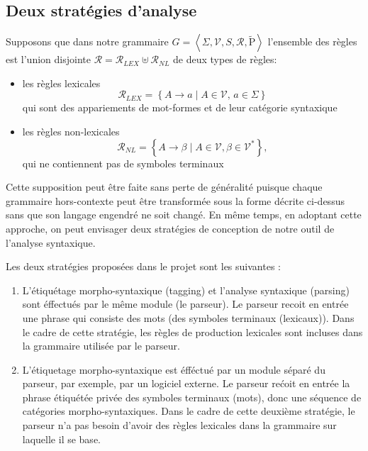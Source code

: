 \documentclass[12pt]{article}
\begin{document}
\subsection{Deux strat\'egies d'analyse}

Supposons que dans notre grammaire $G = \left< \Sigma, \mathscr{V}, S, \mathscr{R}, \tilde{\mathrm{P}} \right>$ 
l'ensemble des r\`egles est l'union disjointe $\mathscr{R} = \mathscr{R}_{LEX} \uplus \mathscr{R}_{NL}$ de deux types de r\`egles:

\begin{itemize}
\item les r\`egles lexicales
$$\mathscr{R}_{LEX} = \left\{ A \rightarrow a \mid
        A \in \mathscr{V}, \, a \in \Sigma \right\}$$
qui sont des appariements de mot-formes et de leur cat\'egorie syntaxique
\item les r\`egles non-lexicales
$$\mathscr{R}_{NL} = \left\{ A \rightarrow \beta \mid
     A \in \mathscr{V}, \beta \in \mathscr{V}^* \right\},$$
qui ne contiennent pas de symboles terminaux
\end{itemize}

Cette supposition peut \^etre faite sans perte de g\'en\'eralit\'e puisque
chaque grammaire hors-contexte peut \^etre transform\'ee sous la forme d\'ecrite ci-dessus sans
que son langage engendr\'e ne soit chang\'e. En m\^eme temps, en adoptant cette
approche, on peut envisager deux strat\'egies de conception de notre outil de
l'analyse syntaxique.

Les deux strat\'egies propos\'ees dans le projet sont les suivantes :
\begin{enumerate}
  \item L'\'etiqu\'etage morpho-syntaxique (tagging) et l'analyse syntaxique
  (parsing) sont \'effectu\'es par le m\^eme module (le parseur). Le
  parseur recoit en entr\'ee une phrase qui consiste des mots (des symboles terminaux (lexicaux)).
  Dans le cadre de cette strat\'egie, les r\`egles de production lexicales sont
  incluses dans la grammaire utilis\'ee par le parseur.
  \item L'\'etiquetage morpho-syntaxique est \'eff\'ectu\'e par un module s\'epar\'e du
  parseur, par exemple, par un logiciel externe. Le parseur re\'coit en entr\'ee la
  phrase \'etiqu\'et\'ee priv\'ee des symboles terminaux (mots), donc une s\'equence de
  cat\'egories morpho-syntaxiques. Dans le cadre de cette deuxi\`eme strat\'egie, le
  parseur n'a pas besoin d'avoir des r\`egles lexicales dans la grammaire sur
  laquelle il se base.
\end{enumerate}
\end{document}

